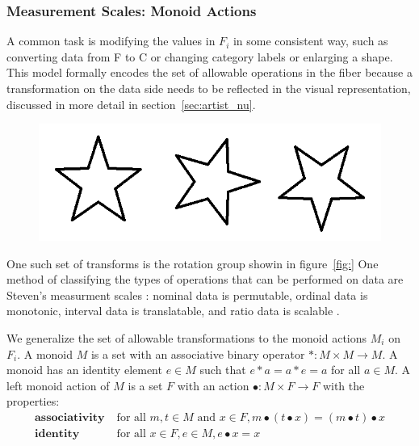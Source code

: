 \documentclass[../main.tex]{subfiles}
\begin{document}
\subsubsection{Measurement Scales: Monoid Actions}
\label{sec:data_monoid}
A common task is modifying the values in $F_i$ in some consistent way, such as converting data from \textdegree F to \textdegree C or changing category labels or enlarging a shape. This model formally encodes the set of allowable operations in the fiber because a transformation on the data side needs to be reflected in the visual representation, discussed in more detail in section~\ref{sec:artist_nu}. 

\begin{figure}
    \includegraphics[width=\textwidth]{figures/math/rotation_actions.png}
    \label{fig:data_monoid_rotation}
\end{figure}
One such set of transforms is the rotation group showin in figure~\ref{fig:}
One method of classifying the types of operations that can be performed on data are Steven's measurment scales \cite{stevensTheoryScalesMeasurement1946,leaFormalizationMeasurementScale}: nominal data is permutable, ordinal data is monotonic, interval data is translatable, and ratio data is scalable \cite{weissteinSimilarityTransformation}.

We generalize the set of allowable transformations to the monoid actions $M_i$ on $F_i$. A monoid \cite{Monoid2021} $M$ is a set with an associative binary operator $\ast:M \times M\rightarrow M$. A monoid has an identity element $e\in M$ such that $e\ast a= a \ast e = a$ for all $a \in M$. A left monoid action \cite{SemigroupAction2021,ActionNLab} of $M$ is a set $F$ with an action $\bullet: M\times F \rightarrow F$ with the properties:
\begin{align*}%
    \textbf{associativity}\;& \text{for all } m,t \in M \text{ and } x\in F, m\bullet(t\bullet x) = (m\bullet t) \bullet x\\
    \textbf{identity}\;& \text{for all } x\in F, e\in M,  e\bullet x = x 
\end{align*}
\end{document}
